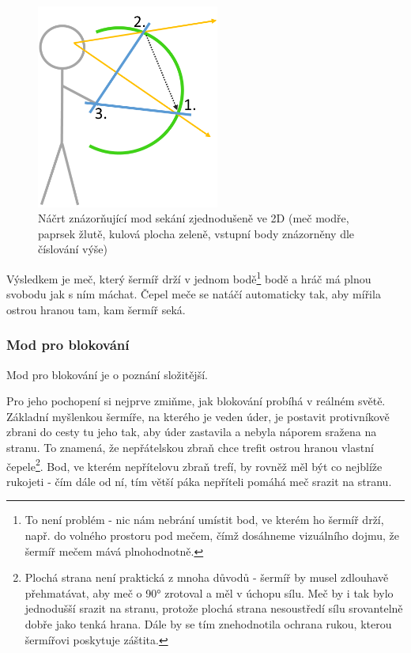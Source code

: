 \begin{figure}[ht]\centering
    \center
    \includegraphics[width=60mm]{../img/diagram-slashingMode.png}
    \caption{Náčrt znázorňující mod sekání zjednodušeně ve 2D (meč modře, paprsek žlutě, kulová plocha zeleně, vstupní body znázorněny dle číslování výše)}
    \label{obr04:swordSlashingMode2D}
\end{figure} 
 
Výsledkem je meč, který šermíř drží v jednom bodě\footnote{To není problém - nic nám nebrání umístit bod, ve kterém ho šermíř drží, např. do volného prostoru pod mečem, čímž dosáhneme vizuálního dojmu, že šermíř mečem mává plnohodnotně.} bodě a hráč má plnou svobodu jak s ním máchat. Čepel meče se natáčí automaticky tak, aby mířila ostrou hranou tam, kam šermíř seká.

\subsubsection*{Mod pro blokování} \label{interfacesSwordMovementBlockingModuleSubsubsection}

Mod pro blokování je o poznání složitější.

Pro jeho pochopení si nejprve zmiňme, jak blokování probíhá v reálném světě. Základní myšlenkou šermíře, na kterého je veden úder, je postavit protivníkově zbrani do cesty tu jeho tak, aby úder zastavila a nebyla náporem sražena na stranu. To znamená, že nepřátelskou zbraň chce trefit ostrou hranou vlastní čepele\footnote{Plochá strana není praktická z mnoha důvodů - šermíř by musel zdlouhavě přehmatávat, aby meč o 90° zrotoval a měl v úchopu sílu. Meč by i tak bylo jednodušší srazit na stranu, protože plochá strana nesoustředí sílu srovantelně dobře jako tenká hrana. Dále by se tím znehodnotila ochrana rukou, kterou šermířovi poskytuje záštita.}. Bod, ve kterém nepřítelovu zbraň trefí, by rovněž měl být co nejblíže rukojeti - čím dále od ní, tím větší páka nepříteli pomáhá meč srazit na stranu.

